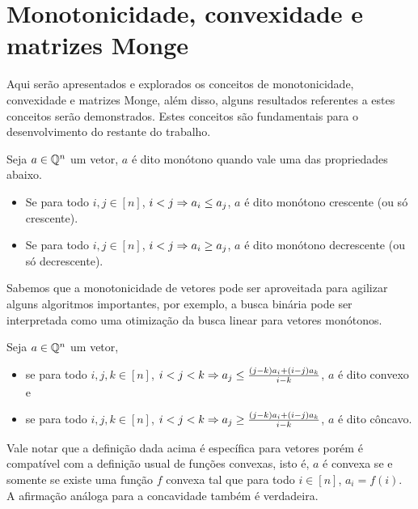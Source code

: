 \section{Monotonicidade, convexidade e matrizes Monge}
\label{MatrizMonge}


Aqui serão apresentados e explorados os conceitos de monotonicidade, convexidade e matrizes Monge, além disso, alguns resultados referentes a estes conceitos serão demonstrados. Estes conceitos são fundamentais para o desenvolvimento do restante do trabalho.

\begin{defi}
Seja $a \in \mathbb{Q}^n$ um vetor, $a$ é dito monótono quando vale uma das propriedades abaixo.
    \begin{itemize}
        \item Se para todo $i,j \in [n]$, $i < j \Rightarrow a_i \leq a_j$, $a$ é dito monótono crescente (ou só crescente).
        \item Se para todo $i,j \in [n]$, $i < j \Rightarrow a_i \geq a_j$, $a$ é dito monótono decrescente (ou só decrescente).
    \end{itemize}
\end{defi}

Sabemos que a monotonicidade de vetores pode ser aproveitada para agilizar alguns algoritmos importantes, por exemplo, a busca binária pode ser interpretada como uma otimização da busca linear para vetores monótonos. 

\begin{defi}
Seja $a \in \mathbb{Q}^n$ um vetor,
    \begin{itemize}
        \item se para todo $i,j,k \in [n]$, $i < j < k \Rightarrow a_j \leq \frac{(j-k)a_i + (i-j)a_k}{i-k}$, $a$ é dito convexo e
        \item se para todo $i,j,k \in [n]$, $i < j < k \Rightarrow a_j \geq \frac{(j-k)a_i + (i-j)a_k}{i-k}$, $a$ é dito côncavo.
    \end{itemize}
\end{defi}

Vale notar que a definição dada acima é específica para vetores porém é compatível com a definição usual de funções convexas, isto é, $a$ é convexa se e somente se existe uma função $f$ convexa tal que para todo $i \in [n]$, $a_i = f(i)$. A afirmação análoga para a concavidade também é verdadeira.  


